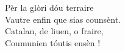 \\\\Pèr la glòri dóu terraire
\\Vautre enfin que sias counsènt.
\\Catalan, de liuen, o fraire,
\\Coumunien tóutis ensèn !
\\
\breakpage